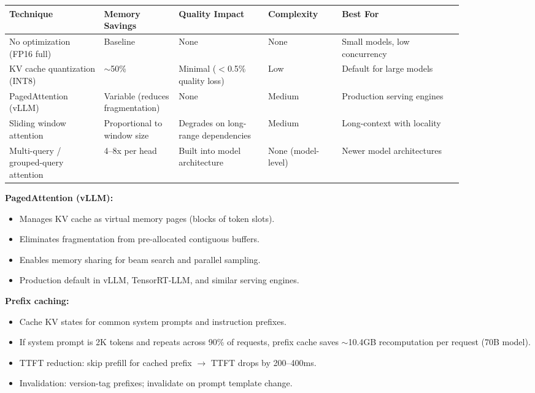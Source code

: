 \small
\begin{tabular}{|p{0.18\linewidth}|p{0.14\linewidth}|p{0.17\linewidth}|p{0.14\linewidth}|p{0.23\linewidth}|}
\hline
\textbf{Technique} & \textbf{Memory Savings} & \textbf{Quality Impact} & \textbf{Complexity} & \textbf{Best For} \\
\hline
No optimization (FP16 full) & Baseline & None & None & Small models, low concurrency \\
\hline
KV cache quantization (INT8) & $\sim$50\% & Minimal ($<$0.5\% quality loss) & Low & Default for large models \\
\hline
PagedAttention (vLLM) & Variable (reduces fragmentation) & None & Medium & Production serving engines \\
\hline
Sliding window attention & Proportional to window size & Degrades on long-range dependencies & Medium & Long-context with locality \\
\hline
Multi-query / grouped-query attention & 4--8x per head & Built into model architecture & None (model-level) & Newer model architectures \\
\hline
\end{tabular}
\normalsize

\textbf{PagedAttention (vLLM):}

\begin{itemize}
  \item Manages KV cache as virtual memory pages (blocks of token slots).
  \item Eliminates fragmentation from pre-allocated contiguous buffers.
  \item Enables memory sharing for beam search and parallel sampling.
  \item Production default in vLLM, TensorRT-LLM, and similar serving engines.
\end{itemize}

\textbf{Prefix caching:}

\begin{itemize}
  \item Cache KV states for common system prompts and instruction prefixes.
  \item If system prompt is 2K tokens and repeats across 90\% of requests, prefix cache saves $\sim$10.4GB recomputation per request (70B model).
  \item TTFT reduction: skip prefill for cached prefix $\rightarrow$ TTFT drops by 200--400ms.
  \item Invalidation: version-tag prefixes; invalidate on prompt template change.
\end{itemize}

